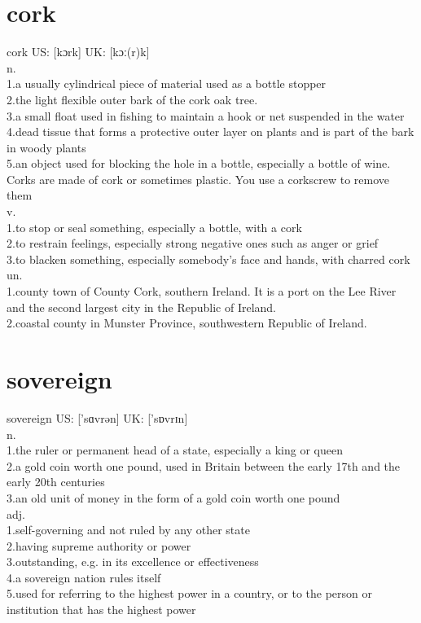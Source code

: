 \documentclass[11pt]{article}
\begin{document}
\section{cork}
\label{sec:orga34d758}
cork US: [kɔrk] UK: [kɔː(r)k]\\
n.\\
1.a usually cylindrical piece of material used as a bottle stopper\\
2.the light flexible outer bark of the cork oak tree.\\
3.a small float used in fishing to maintain a hook or net suspended in the water\\
4.dead tissue that forms a protective outer layer on plants and is part of the bark in woody plants\\
5.an object used for blocking the hole in a bottle, especially a bottle of wine. Corks are made of cork or sometimes plastic. You use a corkscrew to remove them\\
v.\\
1.to stop or seal something, especially a bottle, with a cork\\
2.to restrain feelings, especially strong negative ones such as anger or grief\\
3.to blacken something, especially somebody's face and hands, with charred cork\\
un.\\
1.county town of County Cork, southern Ireland. It is a port on the Lee River and the second largest city in the Republic of Ireland.\\
2.coastal county in Munster Province, southwestern Republic of Ireland.\\
\section{sovereign}
\label{sec:orgc579436}
sovereign US: ['sɑvrən] UK: ['sɒvrɪn]\\
n.\\
1.the ruler or permanent head of a state, especially a king or queen\\
2.a gold coin worth one pound, used in Britain between the early 17th and the early 20th centuries\\
3.an old unit of money in the form of a gold coin worth one pound\\
adj.\\
1.self-governing and not ruled by any other state\\
2.having supreme authority or power\\
3.outstanding, e.g. in its excellence or effectiveness\\
4.a sovereign nation rules itself\\
5.used for referring to the highest power in a country, or to the person or institution that has the highest power\\
\end{document}

